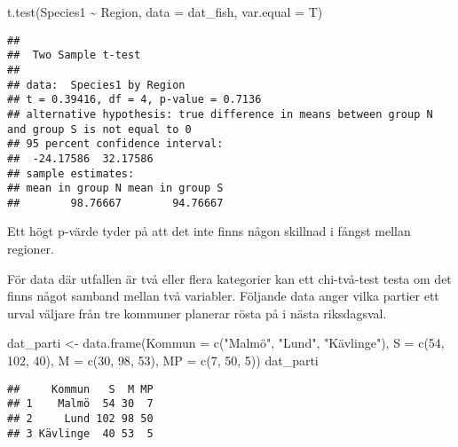 \documentclass[
]{book}
\newenvironment{Shaded}{\begin{snugshade}}{\end{snugshade}}
\newcommand{\AttributeTok}[1]{\textcolor[rgb]{0.77,0.63,0.00}{#1}}
\newcommand{\DecValTok}[1]{\textcolor[rgb]{0.00,0.00,0.81}{#1}}
\newcommand{\FunctionTok}[1]{\textcolor[rgb]{0.00,0.00,0.00}{#1}}
\newcommand{\NormalTok}[1]{#1}
\newcommand{\OtherTok}[1]{\textcolor[rgb]{0.56,0.35,0.01}{#1}}
\newcommand{\SpecialCharTok}[1]{\textcolor[rgb]{0.00,0.00,0.00}{#1}}
\newcommand{\StringTok}[1]{\textcolor[rgb]{0.31,0.60,0.02}{#1}}
\theoremstyle{definition}
\theoremstyle{definition}
\theoremstyle{definition}
\theoremstyle{definition}
\theoremstyle{remark}
\begin{document}
\begin{Shaded}
\begin{Highlighting}[]
\FunctionTok{t.test}\NormalTok{(Species1 }\SpecialCharTok{\textasciitilde{}}\NormalTok{ Region, }\AttributeTok{data =}\NormalTok{ dat\_fish, }\AttributeTok{var.equal =}\NormalTok{ T)}
\end{Highlighting}
\end{Shaded}

\begin{verbatim}
## 
##  Two Sample t-test
## 
## data:  Species1 by Region
## t = 0.39416, df = 4, p-value = 0.7136
## alternative hypothesis: true difference in means between group N and group S is not equal to 0
## 95 percent confidence interval:
##  -24.17586  32.17586
## sample estimates:
## mean in group N mean in group S 
##        98.76667        94.76667
\end{verbatim}

Ett högt p-värde tyder på att det inte finns någon skillnad i fångst mellan regioner.

För data där utfallen är två eller flera kategorier kan ett chi-två-test testa om det finns något samband mellan två variabler. Följande data anger vilka partier ett urval väljare från tre kommuner planerar rösta på i nästa riksdagsval.

\begin{Shaded}
\begin{Highlighting}[]
\NormalTok{dat\_parti }\OtherTok{\textless{}{-}} \FunctionTok{data.frame}\NormalTok{(}\AttributeTok{Kommun =} \FunctionTok{c}\NormalTok{(}\StringTok{"Malmö"}\NormalTok{, }\StringTok{"Lund"}\NormalTok{, }\StringTok{"Kävlinge"}\NormalTok{),}
                        \AttributeTok{S =} \FunctionTok{c}\NormalTok{(}\DecValTok{54}\NormalTok{, }\DecValTok{102}\NormalTok{, }\DecValTok{40}\NormalTok{),}
                        \AttributeTok{M =} \FunctionTok{c}\NormalTok{(}\DecValTok{30}\NormalTok{, }\DecValTok{98}\NormalTok{, }\DecValTok{53}\NormalTok{),}
                        \AttributeTok{MP =} \FunctionTok{c}\NormalTok{(}\DecValTok{7}\NormalTok{, }\DecValTok{50}\NormalTok{, }\DecValTok{5}\NormalTok{))}
\NormalTok{dat\_parti}
\end{Highlighting}
\end{Shaded}

\begin{verbatim}
##     Kommun   S  M MP
## 1    Malmö  54 30  7
## 2     Lund 102 98 50
## 3 Kävlinge  40 53  5
\end{verbatim}
\end{document}
